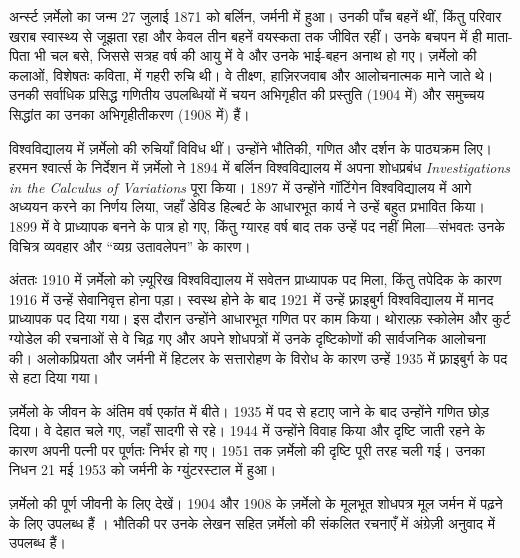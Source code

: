\documentclass[../../../include/open-logic-section]{subfiles}
\begin{document}



अर्न्स्ट ज़र्मेलो का जन्म 27 जुलाई 1871 को बर्लिन, जर्मनी में हुआ। उनकी
पाँच बहनें थीं, किंतु परिवार खराब स्वास्थ्य से जूझता रहा और केवल तीन बहनें
वयस्कता तक जीवित रहीं। उनके बचपन में ही माता-पिता भी चल बसे, जिससे सत्रह
वर्ष की आयु में वे और उनके भाई-बहन अनाथ हो गए। ज़र्मेलो की कलाओं, विशेषतः
कविता, में गहरी रुचि थी। वे तीक्ष्ण, हाज़िरजवाब और आलोचनात्मक माने जाते थे।
उनकी सर्वाधिक प्रसिद्ध गणितीय उपलब्धियों में चयन अभिगृहीत की प्रस्तुति
(1904 में) और समुच्चय सिद्धांत का उनका अभिगृहीतीकरण (1908 में) हैं।

विश्वविद्यालय में ज़र्मेलो की रुचियाँ विविध थीं। उन्होंने भौतिकी, गणित और
दर्शन के पाठ्यक्रम लिए। हरमन श्वार्त्स के निर्देशन में ज़र्मेलो ने 1894 में
बर्लिन विश्वविद्यालय में अपना शोधप्रबंध \emph{Investigations in the
Calculus of Variations} पूरा किया। 1897 में उन्होंने गॉटिंगेन विश्वविद्यालय
में आगे अध्ययन करने का निर्णय लिया, जहाँ डेविड हिल्बर्ट के आधारभूत कार्य ने
उन्हें बहुत प्रभावित किया। 1899 में वे प्राध्यापक बनने के पात्र हो गए, किंतु
ग्यारह वर्ष बाद तक उन्हें पद नहीं मिला---संभवतः उनके विचित्र व्यवहार और
``व्यग्र उतावलेपन'' के कारण।

अंततः 1910 में ज़र्मेलो को ज़्यूरिख विश्वविद्यालय में सवेतन प्राध्यापक पद
मिला, किंतु तपेदिक के कारण 1916 में उन्हें सेवानिवृत्त होना पड़ा। स्वस्थ होने
के बाद 1921 में उन्हें फ़्राइबुर्ग विश्वविद्यालय में मानद प्राध्यापक पद दिया
गया। इस दौरान उन्होंने आधारभूत गणित पर काम किया। थोराल्फ़ स्कोलेम और कुर्ट
ग्योडेल की रचनाओं से वे चिढ़ गए और अपने शोधपत्रों में उनके दृष्टिकोणों की
सार्वजनिक आलोचना की। अलोकप्रियता और जर्मनी में हिटलर के सत्तारोहण के विरोध
के कारण उन्हें 1935 में फ़्राइबुर्ग के पद से हटा दिया गया।
 
ज़र्मेलो के जीवन के अंतिम वर्ष एकांत में बीते। 1935 में पद से हटाए जाने के
बाद उन्होंने गणित छोड़ दिया। वे देहात चले गए, जहाँ सादगी से रहे। 1944 में
उन्होंने विवाह किया और दृष्टि जाती रहने के कारण अपनी पत्नी पर पूर्णतः निर्भर
हो गए। 1951 तक ज़र्मेलो की दृष्टि पूरी तरह चली गई। उनका निधन 21 मई 1953 को
जर्मनी के ग्युंटरस्टाल में हुआ।

\begin{reading}
ज़र्मेलो की पूर्ण जीवनी के लिए \citet{Ebbinghaus2015} देखें। 1904 और 1908
के ज़र्मेलो के मूलभूत शोधपत्र मूल जर्मन में पढ़ने के लिए उपलब्ध हैं
\citep{Zermelo1904,Zermelo1908}। भौतिकी पर उनके लेखन सहित ज़र्मेलो की
संकलित रचनाएँ \citep{Ebbinghaus2010,Ebbinghaus2013} में अंग्रेज़ी अनुवाद
में उपलब्ध हैं।
\end{reading}
\end{document}
